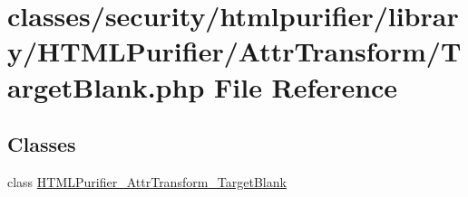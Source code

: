 \hypertarget{AttrTransform_2TargetBlank_8php}{\section{classes/security/htmlpurifier/library/\+H\+T\+M\+L\+Purifier/\+Attr\+Transform/\+Target\+Blank.php File Reference}
\label{AttrTransform_2TargetBlank_8php}
}
\subsection*{Classes}
\begin{DoxyCompactItemize}
\item 
class \hyperlink{classHTMLPurifier__AttrTransform__TargetBlank}{H\+T\+M\+L\+Purifier\+\_\+\+Attr\+Transform\+\_\+\+Target\+Blank}
\end{DoxyCompactItemize}

